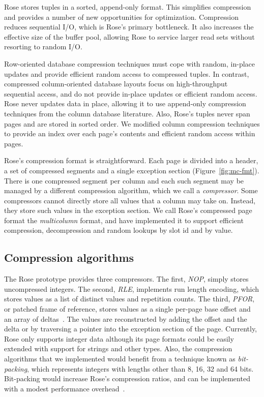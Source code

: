 \documentclass{vldb}
\newcommand{\rows}{Rose\xspace}
\newcommand{\rowss}{Rose's\xspace}
\begin{document}
\rows stores tuples in a sorted, append-only format.  This 
simplifies compression and provides a number of new opportunities for
optimization.  Compression reduces sequential I/O, which is \rowss primary bottleneck.
It also
increases the effective size of the buffer pool, allowing \rows to
service larger read sets without resorting to random I/O.

Row-oriented database compression techniques must cope with random,
in-place updates and provide efficient random access to compressed
tuples.  In contrast, compressed column-oriented database layouts
focus on high-throughput sequential access, and do not provide in-place
updates or efficient random access.  \rows never updates data in
place, allowing it to use append-only compression techniques
from the column database literature.  Also, \rowss tuples never span pages and
are stored in sorted order.  We modified column compression techniques to provide an
index over each page's contents and efficient random access within
pages.

\rowss compression format is straightforward.  Each page is divided into
a header, a set of compressed segments and a single exception section
(Figure~\ref{fig:mc-fmt}).  There is one compressed segment per column
and each such segment may be managed by a different compression
algorithm, which we call a {\em compressor}.  Some compressors cannot
directly store all values that a column may take on.  Instead, they
store such values in the exception section.  We call
\rowss compressed page format the {\em multicolumn} format, and have
implemented it to support efficient compression,
decompression and random lookups by slot id and by value.

\subsection{Compression algorithms}
The \rows prototype provides three compressors.  The first, {\em NOP},
simply stores uncompressed integers.  The second, {\em RLE},
implements run length encoding, which stores values as a list of
distinct values and repetition counts.  The third, {\em PFOR}, or
patched frame of reference, stores values as a single per-page
base offset and an array of deltas~\cite{pfor}.  The values are reconstructed by
adding the offset and the delta or by traversing a pointer into the
exception section of the page.  Currently, \rows only supports integer
data although its page formats could be easily extended with support for strings and
other types.  Also, the compression algorithms that we
implemented would benefit from a technique known as {\em bit-packing},
which represents integers with lengths other than 8, 16, 32 and 64
bits.  Bit-packing would increase \rowss compression ratios,
and can be implemented with a modest performance overhead~\cite{pfor}.
\end{document}
